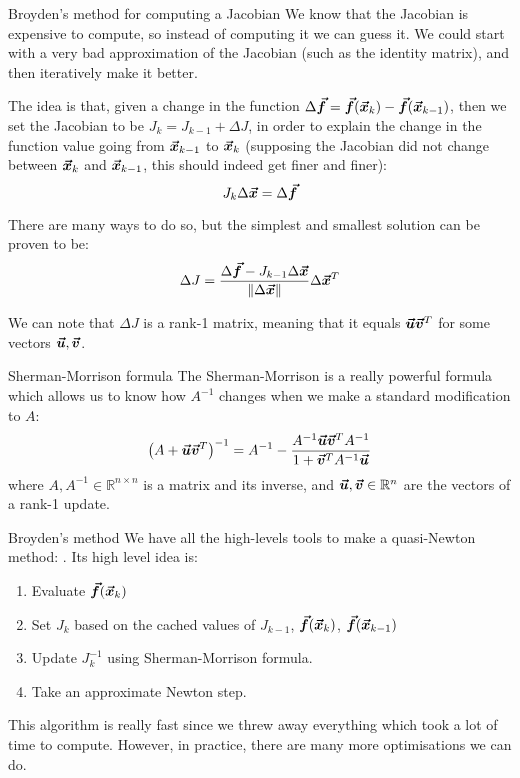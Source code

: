 \documentclass[a4paper]{article}
\begin{document}
\begin{parag}{Broyden's method for computing a Jacobian}
    We know that the Jacobian is expensive to compute, so instead of computing it we can guess it. We could start with a very bad approximation of the Jacobian (such as the identity matrix), and then iteratively make it better.

    The idea is that, given a change in the function $\Delta \bvec{f} = \bvec{f}\left(\bvec{x}_k\right) - \bvec{f}\left(\bvec{x}_{k-1}\right)$, then we set the Jacobian to be $J_k = J_{k-1} + \Delta J$, in order to explain the change in the function value going from $\bm{\protect\vec{x}}_{k-1}$ to $\bm{\protect\vec{x}}_k$ (supposing the Jacobian did not change between $\bm{\protect\vec{x}}_k$ and $\bm{\protect\vec{x}}_{k-1}$, this should indeed get finer and finer): 
    \[J_k \Delta \bm{\protect\vec{x}} = \Delta \bm{\protect\vec{f}}\]

    There are many ways to do so, but the simplest and smallest solution can be proven to be: 
    \[\Delta J = \frac{\Delta \bvec{f} - J_{k-1} \Delta \bvec{x}}{\left\|\Delta \bvec{x}\right\|} \Delta \bvec{x}^T\]
    
    We can note that $\Delta J$ is a rank-1 matrix, meaning that it equals $\bm{\protect\vec{u}} \bm{\protect\vec{v}}^T$ for some vectors $\bm{\protect\vec{u}}, \bm{\protect\vec{v}}$.
\end{parag}

\begin{parag}{Sherman-Morrison formula}
    The Sherman-Morrison is a really powerful formula which allows us to know how $A^{-1}$ changes when we make a standard modification to $A$: 
    \[\left(A + \bvec{u} \bvec{v}^T\right)^{-1} = A^{-1} - \frac{A^{-1} \bvec{u} \bvec{v}^T A^{-1}}{1 + \bvec{v}^T A^{-1} \bvec{u}}\]
    where $A, A^{-1} \in \mathbb{R}^{n \times n}$ is a matrix and its inverse, and $\bm{\protect\vec{u}}, \bm{\protect\vec{v}} \in \mathbb{R}^n$ are the vectors of a rank-1 update.
\end{parag}

\begin{parag}{Broyden's method}
    We have all the high-levels tools to make a quasi-Newton method: . Its high level idea is:
    \begin{enumerate}
        \item Evaluate $\bvec{f}\left(\bvec{x}_k\right)$
        \item Set $J_k$ based on the cached values of $J_{k-1}$, $\bvec{f}\left(\bvec{x}_k\right)$, $\bvec{f}\left(\bvec{x}_{k-1}\right)$
        \item Update $J_k^{-1}$ using Sherman-Morrison formula.
        \item Take an approximate Newton step.
    \end{enumerate}
    
    This algorithm is really fast since we threw away everything which took a lot of time to compute. However, in practice, there are many more optimisations we can do.
\end{parag}
\end{document}
